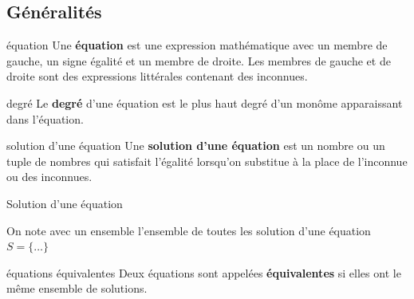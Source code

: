 \documentclass[a4paper,12pt]{article}
\begin{document}
\subsection{Généralités}
\begin{definition}
	équation
	\tcblower
	Une {\bfseries équation} est une expression mathématique avec un membre de gauche, un signe égalité et un membre de droite. Les membres de gauche et de droite sont des expressions littérales contenant des inconnues.
	\begin{center}
\end{center}
\end{definition}
\begin{definition}
	degré
	\tcblower
	Le {\bfseries degré} d'une équation est le plus haut degré d'un monôme apparaissant dans l'équation.
\end{definition}
\begin{definition}
	solution d'une équation
	\tcblower
	Une {\bfseries solution d'une équation} est un nombre ou un tuple de nombres qui satisfait l'égalité lorsqu'on substitue à la place de l'inconnue ou des inconnues.
\end{definition}
\begin{exemple}
	Solution d'une équation
	\tcblower
\vspace{6cm}

\end{exemple}
On note avec un ensemble l'ensemble de toutes les solution d'une équation $S=\{\ldots\}$ 
\begin{definition}
	équations équivalentes
	\tcblower
	Deux équations sont appelées {\bfseries équivalentes} si elles ont le même ensemble de solutions. 
\end{definition}
\end{document}
